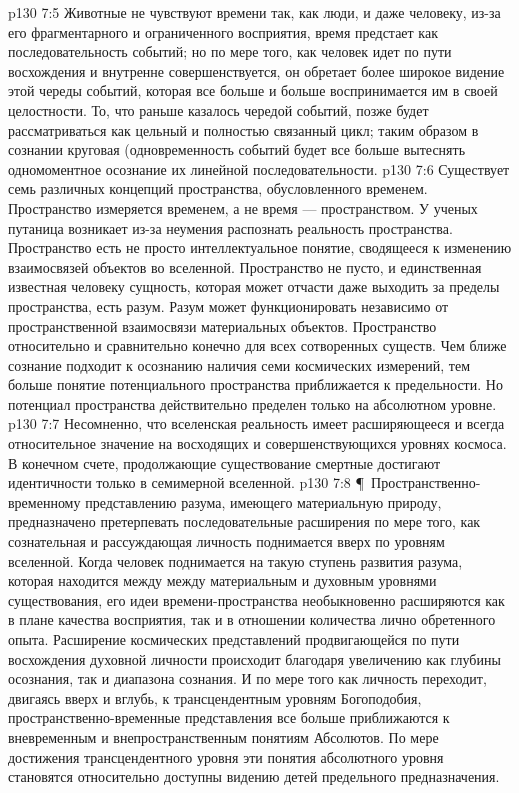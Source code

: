 \vs p130 7:5 Животные не чувствуют времени так, как люди, и даже человеку, из\hyp{}за его фрагментарного и ограниченного восприятия, время предстает как последовательность событий; но по мере того, как человек идет по пути восхождения и внутренне совершенствуется, он обретает более широкое видение этой череды событий, которая все больше и больше воспринимается им в своей целостности. То, что раньше казалось чередой событий, позже будет рассматриваться как цельный и полностью связанный цикл; таким образом в сознании круговая (одновременность событий будет все больше вытеснять одномоментное осознание их линейной последовательности.
\vs p130 7:6 Существует семь различных концепций пространства, обусловленного временем. Пространство измеряется временем, а не время --- пространством. У ученых путаница возникает из\hyp{}за неумения распознать реальность пространства. Пространство есть не просто интеллектуальное понятие, сводящееся к изменению взаимосвязей объектов во вселенной. Пространство не пусто, и единственная известная человеку сущность, которая может отчасти даже выходить за пределы пространства, есть разум. Разум может функционировать независимо от пространственной взаимосвязи материальных объектов. Пространство относительно и сравнительно конечно для всех сотворенных существ. Чем ближе сознание подходит к осознанию наличия семи космических измерений, тем больше понятие потенциального пространства приближается к предельности. Но потенциал пространства действительно пределен только на абсолютном уровне.
\vs p130 7:7 Несомненно, что вселенская реальность имеет расширяющееся и всегда относительное значение на восходящих и совершенствующихся уровнях космоса. В конечном счете, продолжающие существование смертные достигают идентичности только в семимерной вселенной.
\vs p130 7:8 \P\ Пространственно\hyp{}временному представлению разума, имеющего материальную природу, предназначено претерпевать последовательные расширения по мере того, как сознательная и рассуждающая личность поднимается вверх по уровням вселенной. Когда человек поднимается на такую ступень развития разума, которая находится между между материальным и духовным уровнями существования, его идеи времени\hyp{}пространства необыкновенно расширяются как в плане качества восприятия, так и в отношении количества лично обретенного опыта. Расширение космических представлений продвигающейся по пути восхождения духовной личности происходит благодаря увеличению как глубины осознания, так и диапазона сознания. И по мере того как личность переходит, двигаясь вверх и вглубь, к трансцендентным уровням Богоподобия, пространственно\hyp{}временные представления все больше приближаются к вневременным и внепространственным понятиям Абсолютов. По мере достижения трансцендентного уровня эти понятия абсолютного уровня становятся относительно доступны видению детей предельного предназначения.
